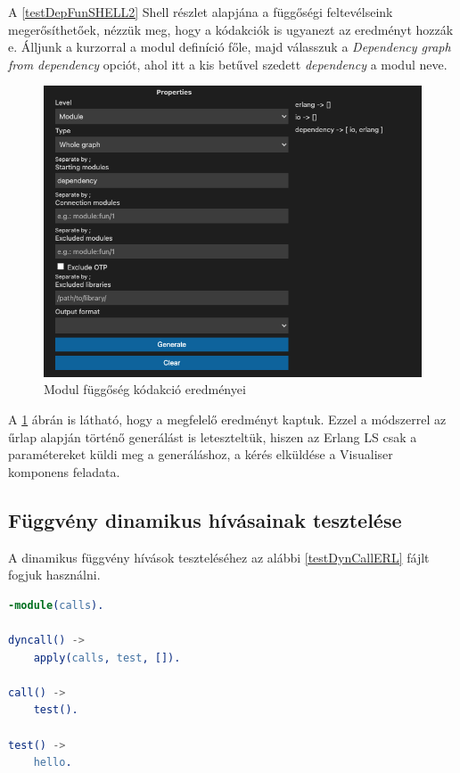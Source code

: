 A \ref{testDepFunSHELL2} Shell részlet alapjána a függőségi feltevélseink megerősíthetőek, nézzük meg, hogy a kódakciók is ugyanezt az eredményt hozzák e. Álljunk a kurzorral a modul definíció főle, majd válasszuk a \textit{Dependency graph from dependency} opciót, ahol itt a kis betűvel szedett \textit{dependency} a modul neve. 


\begin{figure}[H]
  \centering
  \includegraphics[width=0.8\linewidth]{images/testCases/depMod.png}
  \caption{Modul függőség kódakció eredményei}
  \label{fig:depMod}
\end{figure}

A \ref{fig:depMod} ábrán is látható, hogy a megfelelő eredményt kaptuk. Ezzel a módszerrel az űrlap alapján történő generálást is leteszteltük, hiszen az Erlang LS csak a paramétereket küldi meg a generáláshoz, a kérés elküldése a Visualiser komponens feladata.


\subsection{Függvény dinamikus hívásainak tesztelése}

A dinamikus függvény hívások teszteléséhez az alábbi \ref{testDynCallERL} fájlt fogjuk használni.

\begin{lstlisting}[language={erlang}]  
-module(calls).

dyncall() ->
    apply(calls, test, []).

call() ->
    test().

test() ->
    hello.
\end{lstlisting}

